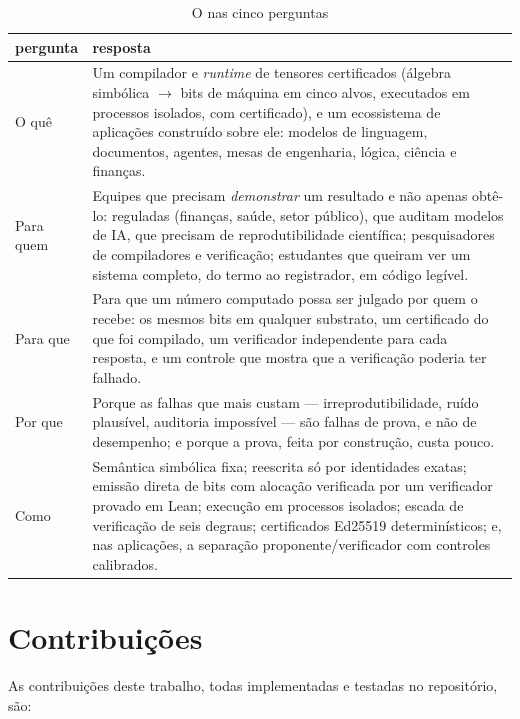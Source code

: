 \begin{table}[htbp]
\centering
\caption{O \vapor{} nas cinco perguntas}\label{tab:cinco}
\small
\begin{tabularx}{\textwidth}{@{}p{2.4cm}X@{}}
\toprule
\textbf{pergunta} & \textbf{resposta}\\
\midrule
O quê & Um compilador e \textit{runtime} de tensores certificados (álgebra simbólica $\to$ bits de máquina em cinco alvos, executados em processos isolados, com certificado), e um ecossistema de aplicações construído sobre ele: modelos de linguagem, documentos, agentes, mesas de engenharia, lógica, ciência e finanças.\\
Para quem & Equipes que precisam \emph{demonstrar} um resultado e não apenas obtê-lo: reguladas (finanças, saúde, setor público), que auditam modelos de IA, que precisam de reprodutibilidade científica; pesquisadores de compiladores e verificação; estudantes que queiram ver um sistema completo, do termo ao registrador, em código legível.\\
Para que & Para que um número computado possa ser julgado por quem o recebe: os mesmos bits em qualquer substrato, um certificado do que foi compilado, um verificador independente para cada resposta, e um controle que mostra que a verificação poderia ter falhado.\\
Por que & Porque as falhas que mais custam --- irreprodutibilidade, ruído plausível, auditoria impossível --- são falhas de prova, e não de desempenho; e porque a prova, feita por construção, custa pouco.\\
Como & Semântica simbólica fixa; reescrita só por identidades exatas; emissão direta de bits com alocação verificada por um verificador provado em Lean; execução em processos isolados; escada de verificação de seis degraus; certificados Ed25519 determinísticos; e, nas aplicações, a separação proponente/verificador com controles calibrados.\\
\bottomrule
\end{tabularx}
\end{table}

\section{Contribuições}\label{sec:contribuicoes}

As contribuições deste trabalho, todas implementadas e testadas no repositório, são:

